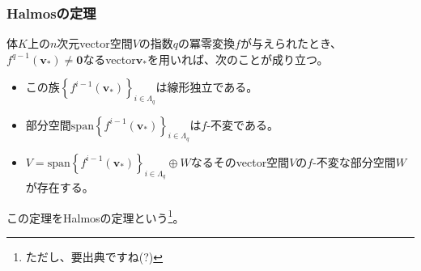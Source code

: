 \documentclass[dvipdfmx]{jsarticle}
\begin{document}
\subsubsection{Halmosの定理}%
\begin{thm}[Halmosの定理]\label{2.2.5.2}
体$K$上の$n$次元vector空間$V$の指数$q$の冪零変換$f$が与えられたとき、$f^{q - 1}\left( \mathbf{v}_{*} \right) \neq \mathbf{0}$なるvector$\mathbf{v}_{*}$を用いれば、次のことが成り立つ。
\begin{itemize}
\item
  この族$\left\{ f^{i - 1}\left( \mathbf{v}_{*} \right)\right\}_{i\in \varLambda_q } $は線形独立である。
\item
  部分空間${\mathrm{span}}\left\{ f^{i - 1}\left( \mathbf{v}_{*} \right) \right\}_{i \in \varLambda_{q}}$は$f$-不変である。
\item
  $V = {\mathrm{span}}\left\{ f^{i - 1}\left( \mathbf{v}_{*} \right) \right\}_{i \in \varLambda_{q}} \oplus W$なるそのvector空間$V$の$f$-不変な部分空間$W$が存在する。
\end{itemize}
この定理をHalmosの定理という\footnote{ただし、要出典ですね(?)}。
\end{thm}
\end{document}
